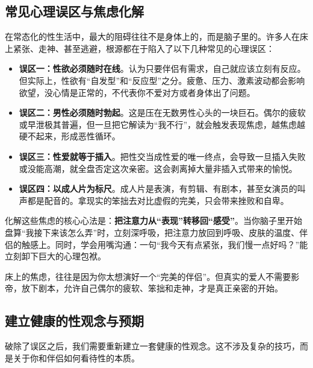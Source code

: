 \documentclass[12pt,UTF8]{ctexbook}
\begin{document}
\subsection{常见心理误区与焦虑化解}

在常态化的性生活中，最大的阻碍往往不是身体上的，而是脑子里的。许多人在床上紧张、走神、甚至逃避，根源都在于陷入了以下几种常见的心理误区：

\begin{itemize}
\item \textbf{误区一：性欲必须随时在线}。认为只要伴侣有需求，自己就应该立刻有反应。但实际上，性欲有“自发型”和“反应型”之分。疲惫、压力、激素波动都会影响欲望，没心情是正常的，不代表你不爱对方或者身体出了问题。
\item \textbf{误区二：男性必须随时勃起}。这是压在无数男性心头的一块巨石。偶尔的疲软或早泄极其普遍，但一旦把它解读为“我不行”，就会触发表现焦虑，越焦虑越硬不起来，形成恶性循环。
\item \textbf{误区三：性爱就等于插入}。把性交当成性爱的唯一终点，会导致一旦插入失败或没能高潮，就全盘否定这次亲密。这会剥离掉大量非插入式带来的愉悦。
\item \textbf{误区四：以成人片为标尺}。成人片是表演，有剪辑、有剧本，甚至女演员的叫声都是配音的。拿现实的笨拙去对比虚假的完美，只会带来挫败和自卑。
\end{itemize}

化解这些焦虑的核心心法是：\textbf{把注意力从“表现”转移回“感受”}。当你脑子里开始盘算“我接下来该怎么弄”时，立刻深呼吸，把注意力放回到呼吸、皮肤的温度、伴侣的触感上。同时，学会用嘴沟通：一句“我今天有点紧张，我们慢一点好吗？”能立刻卸下巨大的心理包袱。

\begin{tcolorbox}[colback=pink!5!white,colframe=red!50!black,title=贴心小叮咛]
床上的焦虑，往往是因为你太想演好一个“完美的伴侣”。但真实的爱人不需要影帝，放下剧本，允许自己偶尔的疲软、笨拙和走神，才是真正亲密的开始。
\end{tcolorbox}

\subsection{建立健康的性观念与预期}

破除了误区之后，我们需要重新建立一套健康的性观念。这不涉及复杂的技巧，而是关于你和伴侣如何看待性的本质。
\end{document}
